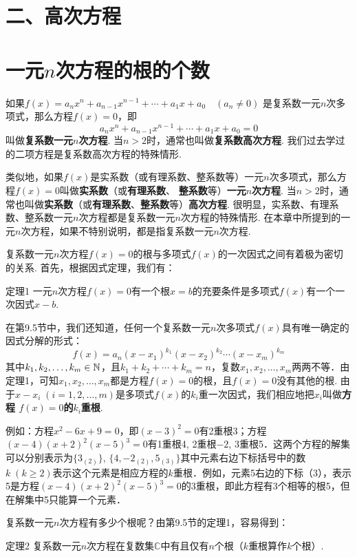 \section*{二、高次方程}

\section{一元$n$次方程的根的个数}
如果$f(x)=a_nx^n+a_{n-1}x^{n-1}+\cdots+a_1x+a_0\quad (a_n\ne 0)$
是复系数一元$n$次多项式，那么方程$f(x)=0$，即
\[a_nx^n+a_{n-1}x^{n-1}+\cdots+a_1x+a_0=0\]
叫做\textbf{复系数一元$n$次方程}. 当$n>2$时，通常也叫做\textbf{复系数高次方程}. 我们过去学过的二项方程是复系数高次方程的特殊情形.

类似地，如果$f(x)$是实系数（或有理系数、整系数等）一元$n$次多项式，那么方程$f(x)=0$叫做\textbf{实系数}（或\textbf{有理系数}、
\textbf{整系数}等）\textbf{一元$n$次方程}. 当$n>2$时，通常也叫做\textbf{实系数}（或\textbf{有理系数}、\textbf{整系数}等）\textbf{高次方程}. 很明显，实系数、有理系数、整系数一元$n$次方程都是复系数一元$n$次方程的特殊情形. 在本章中所提到的一元$n$次方程，如果不特别说明，都是指复系数一元$n$次方程.

复系数一元$n$次方程$f(x)=0$的根与多项式$f(x)$的一次因式之间有着极为密切的关系. 首先，根据因式定理，我们有：

\begin{thm}
    {定理1} 一元$n$次方程$f(x)=0$有一个根$x=b$的充要条件是多项式$f(x)$有一个一次因式$x-b$.
\end{thm}

在第9.5节中，我们还知道，任何一个复系数一元$n$次多项式$f(x)$具有唯一确定的因式分解的形式：
\[f(x)=a_n(x-x_1)^{k_1}(x-x_2)^{k_2}\cdots (x-x_m)^{k_m}\]
其中$k_1,k_2,\ldots,k_m\in\mathbb{N}$，且$k_1+k_2+\cdots +k_m=n$，复数$x_1,x_2,\ldots,x_m$两两不等．由定理1，可知$x_1,x_2,\ldots,x_m$都是方程$f(x)=0$的根，且$f(x)=0$没有其他的根. 由于$x-x_i\; (i=1,2,\ldots,m)$是多项式$f(x)$的$k_i$重一次因式，我们相应地把$x_i$叫做\textbf{方程
$f(x)=0$的$k_i$重根}.

例如：方程$x^2-6x+9=0$，即$(x-3)^2=0$有2重根3；方程$(x-4)(x+2)^2(x-5)^3=0$有1重根4, 2重根$-2$, 3重根5．这两个方程的解集可以分别表示为$\{3_{(2)}\}$, $\{4,-2_{(2)},5_{(3)}\}$其中元素右边下标括号中的数$k\;(k\ge 2)$表示这个元素是相应方程的$k$重根．例如，元素5右边的下标（3），表示5是方程$(x-4)(x+2)^2(x-5)^3=0$的3重根，即此方程有3个相等的根5，但在解集中5只能算一个元素．

复系数一元$n$次方程有多少个根呢？由第9.5节的定理1，容易得到：

\begin{thm}
{定理2} 复系数一元$n$次方程在复数集$\mathbb{C}$中有且仅有$n$个根（$k$重根算作$k$个根）.    
\end{thm}

